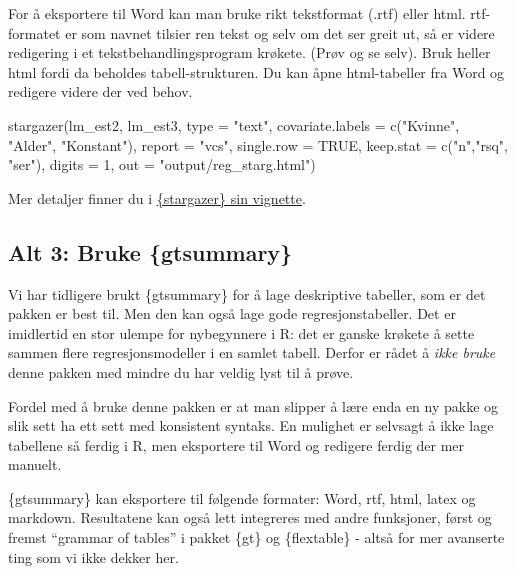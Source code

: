 \documentclass[
  letterpaper,
  DIV=11,
  numbers=noendperiod]{scrreprt}
\newenvironment{Shaded}{\begin{snugshade}}{\end{snugshade}}
\newcommand{\AttributeTok}[1]{\textcolor[rgb]{0.40,0.45,0.13}{#1}}
\newcommand{\ConstantTok}[1]{\textcolor[rgb]{0.56,0.35,0.01}{#1}}
\newcommand{\DecValTok}[1]{\textcolor[rgb]{0.68,0.00,0.00}{#1}}
\newcommand{\FunctionTok}[1]{\textcolor[rgb]{0.28,0.35,0.67}{#1}}
\newcommand{\NormalTok}[1]{\textcolor[rgb]{0.00,0.23,0.31}{#1}}
\newcommand{\StringTok}[1]{\textcolor[rgb]{0.13,0.47,0.30}{#1}}
\theoremstyle{definition}
\theoremstyle{remark}
\begin{document}
For å eksportere til Word kan man bruke rikt tekstformat (.rtf) eller
html. rtf-formatet er som navnet tilsier ren tekst og selv om det ser
greit ut, så er videre redigering i et tekstbehandlingsprogram krøkete.
(Prøv og se selv). Bruk heller html fordi da beholdes tabell-strukturen.
Du kan åpne html-tabeller fra Word og redigere videre der ved behov.

\begin{Shaded}
\begin{Highlighting}[]
\FunctionTok{stargazer}\NormalTok{(lm\_est2, lm\_est3, }
          \AttributeTok{type =} \StringTok{"text"}\NormalTok{,}
          \AttributeTok{covariate.labels =} \FunctionTok{c}\NormalTok{(}\StringTok{"Kvinne"}\NormalTok{, }\StringTok{"Alder"}\NormalTok{, }\StringTok{"Konstant"}\NormalTok{),}
          \AttributeTok{report =} \StringTok{"vcs"}\NormalTok{,}
          \AttributeTok{single.row =} \ConstantTok{TRUE}\NormalTok{, }
          \AttributeTok{keep.stat =} \FunctionTok{c}\NormalTok{(}\StringTok{"n"}\NormalTok{,}\StringTok{"rsq"}\NormalTok{, }\StringTok{"ser"}\NormalTok{),}
          \AttributeTok{digits =} \DecValTok{1}\NormalTok{, }
          \AttributeTok{out =} \StringTok{"output/reg\_starg.html"}\NormalTok{)}
\end{Highlighting}
\end{Shaded}

Mer detaljer finner du i
\href{https://cran.r-project.org/web/packages/stargazer/vignettes/stargazer.pdf}{\{stargazer\}
sin vignette}.

\hypertarget{alt-3-bruke-gtsummary}{%
\subsection{Alt 3: Bruke \{gtsummary\}}\label{alt-3-bruke-gtsummary}}

Vi har tidligere brukt \{gtsummary\} for å lage deskriptive tabeller,
som er det pakken er best til. Men den kan også lage gode
regresjonstabeller. Det er imidlertid en stor ulempe for nybegynnere i
R: det er ganske krøkete å sette sammen flere regresjonsmodeller i en
samlet tabell. Derfor er rådet å \emph{ikke bruke} denne pakken med
mindre du har veldig lyst til å prøve.

Fordel med å bruke denne pakken er at man slipper å lære enda en ny
pakke og slik sett ha ett sett med konsistent syntaks. En mulighet er
selvsagt å ikke lage tabellene så ferdig i R, men eksportere til Word og
redigere ferdig der mer manuelt.

\{gtsummary\} kan eksportere til følgende formater: Word, rtf, html,
latex og markdown. Resultatene kan også lett integreres med andre
funksjoner, først og fremst ``grammar of tables'' i pakket \{gt\} og
\{flextable\} - altså for mer avanserte ting som vi ikke dekker her.
\end{document}

